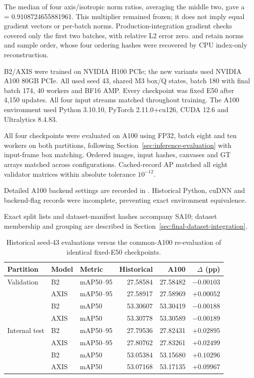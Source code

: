 The median of four axis/isotropic norm ratios, averaging the middle two, gave a = 0.9108724655881961. This multiplier remained frozen; it does not imply equal gradient vectors or per-batch norms. Production-integration gradient checks covered only the first two batches, with relative L2 error zero.  and  retain norms and sample order, whose four ordering hashes were recovered by CPU index-only reconstruction.

B2/AXIS were trained on NVIDIA H100 PCIe; the new variants used NVIDIA A100 80GB PCIe. All used seed 43, shared M3 box/Q states, batch 180 with final batch 174, 40 workers and BF16 AMP. Every checkpoint was fixed E50 after 4,150 updates. All four input streams matched throughout training. The A100 environment used Python 3.10.10, PyTorch 2.11.0+cu126, CUDA 12.6 and Ultralytics 8.4.83.

All four checkpoints were evaluated on A100 using FP32, batch eight and ten workers on both partitions, following Section~\ref{sec:inference-evaluation} with input-frame box matching. Ordered images, input hashes, canvases and GT arrays matched across configurations. Cached-record AP matched all eight validator matrices within absolute tolerance \(10^{-12}\).

Detailed A100 backend settings are recorded in . Historical Python, cuDNN and backend-flag records were incomplete, preventing exact environment equivalence.

Exact split lists and dataset-manifest hashes accompany SA10; dataset membership and grouping are described in Section~\ref{sec:final-dataset-integration}.

\begin{table}[htbp]
\centering
\small
\setlength{\tabcolsep}{4pt}
\begin{tabular}{lllrrr}
\toprule
Partition & Model & Metric & Historical & A100 & $\Delta$ (pp)\\
\midrule
Validation & B2 & mAP50--95 & 27.58584 & 27.58482 & $-0.00103$\\
 & AXIS & mAP50--95 & 27.58917 & 27.58969 & $+0.00052$\\
 & B2 & mAP50 & 53.30607 & 53.30419 & $-0.00188$\\
 & AXIS & mAP50 & 53.30778 & 53.30589 & $-0.00189$\\
\midrule
Internal test & B2 & mAP50--95 & 27.79536 & 27.82431 & $+0.02895$\\
 & AXIS & mAP50--95 & 27.80762 & 27.83261 & $+0.02499$\\
 & B2 & mAP50 & 53.05384 & 53.15680 & $+0.10296$\\
 & AXIS & mAP50 & 53.07168 & 53.17135 & $+0.09967$\\
\bottomrule
\end{tabular}
\caption{Historical seed-43 evaluations versus the common-A100 re-evaluation of identical fixed-E50 checkpoints.}
\label{tab:a10-historical-evaluation}
\end{table}

